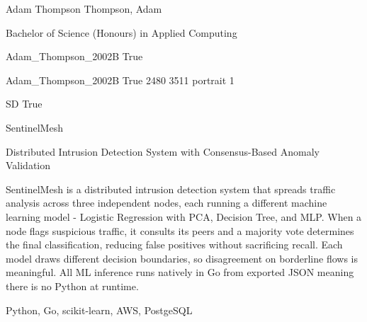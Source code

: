 \documentclass[twoside]{report}
\begin{document}
\begingroup{}\relax



\def\Key{Adam_Thompson_2002B}

{Adam Thompson}
{Thompson, Adam}

{Bachelor of Science (Honours) in Applied Computing}

{Adam_Thompson_2002B}
{True}

{Adam_Thompson_2002B}
{True}
{2480}
{3511}
{portrait}
{1}

{SD}
{True}

{SentinelMesh}

{Distributed Intrusion Detection System with Consensus-Based Anomaly Validation}

{SentinelMesh is a distributed intrusion detection system that spreads traffic analysis across three independent nodes, each running a different machine learning model - Logistic Regression with PCA, Decision Tree, and MLP. When a node flags suspicious traffic, it consults its peers and a majority vote determines the final classification, reducing false positives without sacrificing recall. Each model draws different decision boundaries, so disagreement on borderline flows is meaningful. All ML inference runs natively in Go from exported JSON meaning there is no Python at runtime.}

{Python, Go, scikit-learn, AWS, PostgeSQL}
\end{document}
